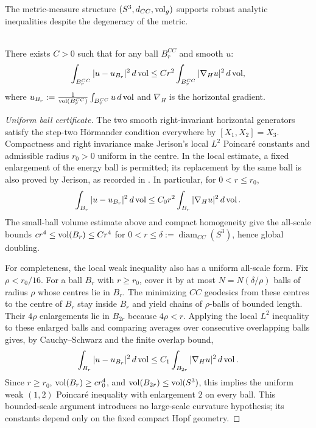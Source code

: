 \documentclass[11pt]{article}
\begin{document}
The metric-measure structure $(S^3, d_{CC}, \operatorname{vol}_g)$ supports robust analytic inequalities despite the degeneracy of the metric.

\begin{theorem}
\label{p1:thm:sr-poincare}
\mbox{}\\[6pt] 
There exists $C > 0$ such that for any ball $B_r^{CC}$ and smooth $u$:
\[
\int_{B_r^{CC}} |u - u_{B_r}|^2\, d\operatorname{vol} \leq C r^2 \int_{B_r^{CC}} |\nabla_H u|^2\, d\operatorname{vol},
\]
where $u_{B_r}:=\frac{1}{\operatorname{vol}(B_r^{CC})}\int_{B_r^{CC}} u\,d\operatorname{vol}$ and $\nabla_H$ is the horizontal gradient.\cite{jerison1986poincare}

\end{theorem}
\begin{proof}[Uniform ball certificate]
The two smooth right-invariant horizontal generators satisfy the
step-two H\"ormander condition everywhere by
$[X_1,X_2]=X_3$.  Compactness and right invariance make Jerison's
local $L^2$ Poincar\'e constants and admissible radius $r_0>0$
uniform in the centre.  In the local estimate, a fixed enlargement of
the energy ball is permitted; its replacement by the same ball is
also proved by Jerison, as recorded in
\cite[Theorem~11.20]{hajlaszkoskela2000}.  In particular, for
$0<r\le r_0$,
\[
 \int_{B_r}|u-u_{B_r}|^2\,d\operatorname{vol}
 \le C_0r^2\int_{B_r}|\nabla_Hu|^2\,d\operatorname{vol}.
\]
The small-ball volume estimate above and compact homogeneity give the
all-scale bounds $cr^4\le\operatorname{vol}(B_r)\le Cr^4$ for
$0<r\le\delta:=\operatorname{diam}_{CC}(S^3)$, hence global doubling.

For completeness, the local weak inequality also has a uniform
all-scale form.  Fix $\rho<r_0/16$.  For a ball $B_r$ with $r\ge r_0$,
cover it by at most $N=N(\delta/\rho)$ balls of radius $\rho$
whose centres lie in $B_r$.  The minimizing $CC$ geodesics from these
centres to the centre of $B_r$ stay inside $B_r$ and yield chains of
$\rho$-balls of bounded length.  Their $4\rho$ enlargements lie in
$B_{2r}$ because $4\rho<r$.  Applying the local $L^2$ inequality to
these enlarged balls and comparing averages over consecutive overlapping
balls gives, by Cauchy--Schwarz and the finite overlap bound,
\[
 \int_{B_r}|u-u_{B_r}|^2\,d\operatorname{vol}
       \le C_1\int_{B_{2r}}|\nabla_Hu|^2\,d\operatorname{vol}.
\]
Since $r\ge r_0$, $\operatorname{vol}(B_r)\ge cr_0^4$, and
$\operatorname{vol}(B_{2r})\le\operatorname{vol}(S^3)$, this implies the uniform weak
$(1,2)$ Poincar\'e inequality with enlargement $2$ on every ball.
This bounded-scale argument introduces no large-scale curvature
hypothesis; its constants depend only on the fixed compact Hopf geometry.


\end{proof}
\end{document}
